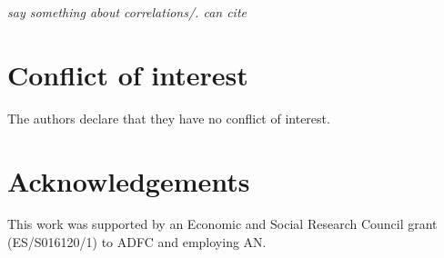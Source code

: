 \documentclass[preprint,12pt,authoryear]{elsarticle}
\begin{document}
\textit{say something about correlations/. can cite \cite{clarke2020stable}}

%
\section*{Conflict of interest}
The authors declare that they have no conflict of interest.

\section*{Acknowledgements}
This work was supported by an Economic and Social Research Council grant (ES/S016120/1) to ADFC and employing AN.

\end{document}
